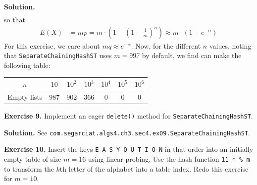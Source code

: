 \documentclass[12pt, a4paper]{article}
\newenvironment{ex}[2][Exercise]
{\par\medskip\noindent \textbf{#1 #2.}}
{\medskip}
\newenvironment{sol}[1][Solution]
{\par\medskip\noindent \textbf{#1.} }
{\medskip}
\begin{document}
\begin{sol}
\begin{align*}
		\end{align*}
		so that
		\begin{align*}
			E(X) &= mp =m\cdot \left(1 - \left(1-\frac{1}{m}\right)^n\right)\approx m\cdot \left(1-e^{-\alpha}\right)
		\end{align*}
		For this exercise, we care about $mq\approx e^{-\alpha}$.
		Now, for the different $n$ values, noting that \texttt{SeparateChainingHashST}
		uses $m=997$ by default, we find can make the following table:
		\begin{center}
			\begin{tabular}{c|cccccc}
				$n$ & $10$ & $10^2$ & $10^3$ & $10^4$ & $10^5$ & $10^6$\\
				\hline
				Empty lists & 987 & 902 & 366 & 0 & 0 & 0
			\end{tabular}
		\end{center}
	\end{sol}
	\begin{ex}{9}
		Implement an eager \texttt{delete()} method for \texttt{SeparateChainingHashST}.
	\end{ex}
	\begin{sol}
		See \texttt{com.segarciat.algs4.ch3.sec4.ex09.SeparateChainingHashST}.
	\end{sol}
	\begin{ex}{10}
		Insert the keys \texttt{E A S Y Q U T I O N} in that order into an initially empty
		table of size $m=16$ using linear probing. Use the hash function \texttt{11 * \% m}
		to transform the $k$th letter of the alphabet into a table index. Redo
		this exercise for $m=10$.
	\end{ex}
\end{document}
